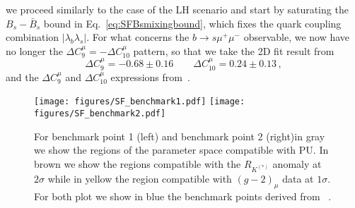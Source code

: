 \documentclass[a4paper,11pt]{article}
\begin{document}
we proceed similarly to the case of the LH scenario and start by saturating the $B_s-\bar B_s$ bound in Eq.~\eqref{eq:SFBsmixingbound}, which fixes the quark coupling combination $|\lambda_b \lambda_s|$. For what concerns the $b\to s\mu^+ \mu^-$ observable, we now have no longer the $\Delta C_9^\mu=-\Delta C_{10}^\mu$  pattern, so that we take the 2D fit result from~\cite{Altmannshofer:2021qrr}
\begin{equation}
\label{eq:C9C10RH}
\Delta C_9^\mu=-0.68\pm0.16 \qquad \Delta C_{10}^\mu=0.24\pm0.13\,, 
\end{equation}
and the $\Delta C_9^\mu$ and $ \Delta C_{10}^\mu$ expressions from~\cite{Arcadi:2021cwg}. 

\begin{figure}[t!]
\begin{center}
\texttt{[image: figures/SF\_benchmark1.pdf]}  \hfill
\texttt{[image: figures/SF\_benchmark2.pdf]} 
\caption{\small 
For benchmark point 1 (left) and benchmark point 2 (right)in gray we show the regions of the parameter space compatible with PU. In brown we show the regions compatible with the $R_{K^{(*)}}$ anomaly at $2\sigma$ while in yellow the region compatible with $(g-2)_\mu$ data at $1\sigma$. For both plot we show in blue the benchmark points derived from ~\cite{Arcadi:2021cwg}. }
\label{fig:SF_RH}
\end{center}
\end{figure}
\end{document}

